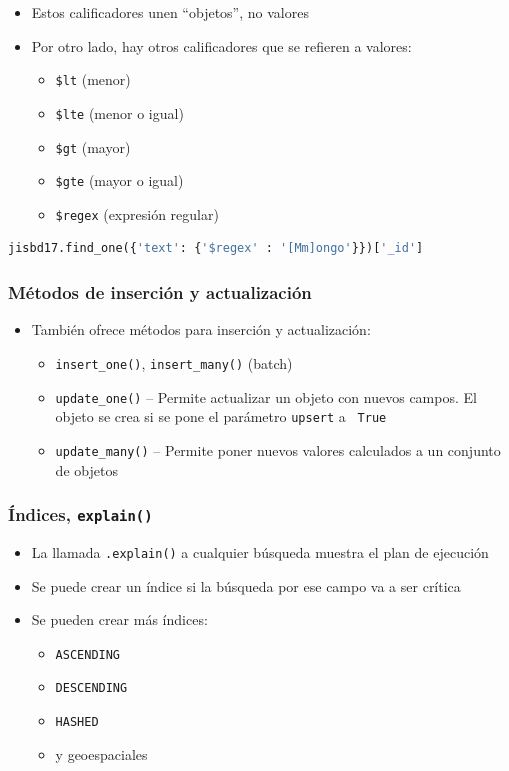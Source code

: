 \documentclass[14pt]{beamer}
\begin{document}
\begin{frame}
\begin{itemize}
\begin{frame}
\begin{itemize}
  \item Estos calificadores unen ``objetos'', no valores
\framebreak
  \item Por otro lado, hay
    otros calificadores que se refieren a valores:
\begin{itemize}
\item \verb|$lt| (menor)
\item \verb|$lte| (menor o igual)
\item \verb|$gt| (mayor)
\item \verb|$gte| (mayor o igual)
\item \verb|$regex| (expresión regular)
\end{itemize}
  \end{itemize}
\begin{lstlisting}[language=Python]
jisbd17.find_one({'text': {'$regex' : '[Mm]ongo'}})['_id']
\end{lstlisting}
\end{frame}

\begin{frame}
  \frametitle{Métodos de inserción y actualización}
  \begin{itemize}
  \item También ofrece métodos para inserción y actualización:
    \begin{itemize}
    \item {\tt insert\_one()}, {\tt insert\_many()} (batch)
    \item {\tt update\_one()} -- Permite actualizar un objeto con nuevos
      campos. El objeto se crea si se pone el parámetro {\tt upsert} a {\tt
        True}
    \item {\tt update\_many()} -- Permite poner nuevos valores calculados a
      un conjunto de objetos
    \end{itemize}
  \end{itemize}
\end{frame}

\begin{frame}
  \frametitle{Índices, {\tt explain()}}
  \begin{itemize}
  \item La llamada {\tt .explain()} a cualquier búsqueda muestra el plan
    de ejecución
\item Se puede crear un índice si la búsqueda por ese campo va a ser
  crítica
\item Se pueden crear más índices:
  \begin{itemize}
  \item {\tt ASCENDING}
  \item {\tt DESCENDING}
  \item {\tt HASHED}
  \item y geoespaciales
  \end{itemize}
  \end{itemize}
\end{frame}


\end{itemize}
\end{frame}
\end{document}
